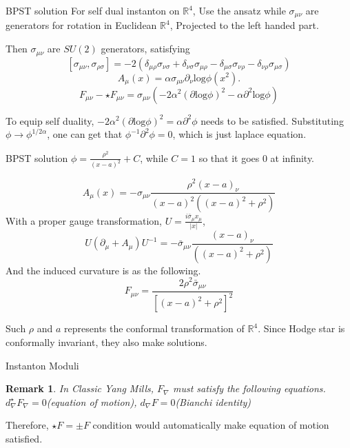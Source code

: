 \documentclass[10pt]{beamer}
\newtheorem{rem}{Remark}
\begin{document}
\begin{frame}{BPST solution}
    For self dual instanton on $\mathbb{R}^4$, Use the ansatz while $\sigma_{\mu\nu}$ are generators for rotation in Euclidean $\mathbb{R}^4$, Projected to the left handed part. 
    
    Then $\sigma_{\mu\nu}$ are $SU(2)$ generators, satisfying
    \[
    [\sigma_{\mu\nu},\sigma_{\rho\sigma}] = -2\left(\delta_{\mu \rho} \sigma_{\nu \sigma}+\delta_{\nu \sigma} \sigma_{\mu \rho}-\delta_{\mu \sigma} \sigma_{\nu \rho}-\delta_{\nu \rho} \sigma_{\mu \sigma}\right)
    \]
    \[
        A_{\mu}(x) = \alpha \sigma_{\mu \nu} \partial_{\nu} \mathrm{log} \phi(x^2).
    \]
    \[
        F_{\mu\nu}-\star F_{\mu\nu} = \sigma_{\mu\nu}(-2\alpha^2(\partial\mathrm{log}\phi)^2-\alpha\partial^2\mathrm{log}\phi)
    \]

To equip self duality, $-2\alpha^2(\partial \mathrm{log}\phi)^2 = \alpha\partial^2\phi$ needs to be satisfied. Substituting $\phi\rightarrow\phi^{1/2\alpha}$, one can get that $\phi^{-1}\partial^2\phi=0$, which is just laplace equation.
\end{frame}

\begin{frame}{BPST solution}
    $\phi = \frac{\rho^2}{(x-a)^2}+C$, while $C=1$ so that it goes 0 at infinity.

    \[
    A_\mu(x) = -\sigma_{\mu\nu}\frac{\rho^2(x-a)_\nu}{(x-a)^2((x-a)^2+\rho^2)}
    \]
    With a proper gauge transformation, $U=\frac{i\bar{\sigma}_\mu x_\mu}{|x|}$,
    \[
    U(\partial_\mu +A_\mu )U^{-1} =  -\bar{\sigma}_{\mu\nu}\frac{(x-a)_\nu}{((x-a)^2+\rho^2)}
    \]
    And the induced curvature is as the following.
    \[
         F_{\mu\nu}=\frac{2 \rho^2 \bar{\sigma}_{\mu \nu}}{\left[(x-a)^2+\rho^2\right]^2}
    \]

    Such $\rho$ and $a$ represents the conformal transformation of $\mathbb{R}^4$. Since Hodge star is conformally invariant, they also make solutions.
\end{frame}



\begin{frame}{Instanton Moduli}
    \begin{rem}
        In Classic Yang Mills, $F_\nabla$ must satisfy the following equations. \\
        $d_\nabla^\star F_\nabla =0$(equation of motion), $d_\nabla F=0$(Bianchi identity)
    \end{rem}
    Therefore, $\star F=\pm F$ condition would automatically make equation of motion satisfied. 
\end{frame}
\end{document}
